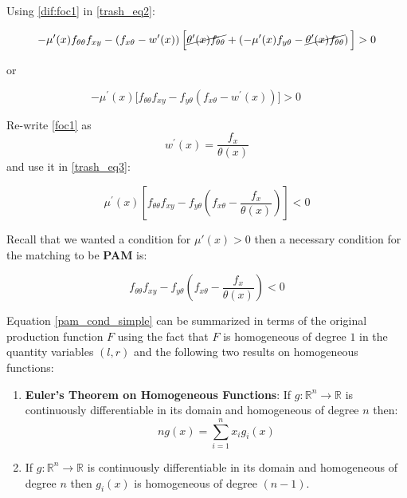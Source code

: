 \documentclass[12pt]{article}
\theoremstyle{definition}
\begin{document}
Using \eqref{dif:foc1} in \eqref{trash_eq2}:

$$-\mu^{\prime}(x) f_{\theta \theta}f_{x y}-\left(f_{x \theta}-w^{\prime}(x)\right)\Big[\cancel{\theta^{\prime}(x)f_{\theta \theta}}+\left(-\mu^{\prime}(x) f_{y \theta}-\cancel{\theta^{\prime}(x) f_{\theta \theta} }\right)\Big] > 0$$

or

\begin{equation}
-\mu^{\prime}(x)\Big[f_{\theta \theta}f_{x y} - f_{y \theta}\left(f_{x \theta}-w^{\prime}(x)\right) \Big]> 0 \qquad \label{trash_eq3}
\end{equation}

Re-write \eqref{foc1} as $$
 w^{\prime}(x) = \frac{f_{x}}{\theta(x)}
$$ and use it in \eqref{trash_eq3}:

\begin{equation}
\mu^{\prime}(x)\left[f_{\theta \theta}f_{x y} - f_{y \theta}\left(f_{x \theta}-\frac{f_{x}}{\theta(x)}\right)\right] < 0 \label{trash_eq4}
\end{equation}{}


Recall that we wanted a condition for $\mu'(x)>0$ then a necessary condition for the matching to be \textbf{PAM} is: 

\begin{equation}
f_{\theta \theta}f_{x y} - f_{y \theta}\left(f_{x \theta}-\frac{f_{x}}{\theta(x)}\right) < 0\label{pam_cond_simple}
\end{equation}

Equation \eqref{pam_cond_simple} can be summarized in terms of the original production function $F$ using the fact that $F$ is homogeneous of degree $1$ in the quantity variables $(l,r)$ and the following two results on homogeneous functions:
\begin{enumerate}
    \item \textbf{Euler's Theorem on Homogeneous Functions}: If $g:\mathbb{R}^{n}\to \mathbb{R}$ is continuously differentiable in its domain and homogeneous of degree $n$ then: $$ng(x)= \sum_{i=1}^{n}x_i g_i(x)$$
    \item If $g:\mathbb{R}^{n}\to \mathbb{R}$ is continuously differentiable in its domain and homogeneous of degree $n$ then $g_i(x)$ is homogeneous of degree $(n-1)$.
\end{enumerate}
\end{document}
